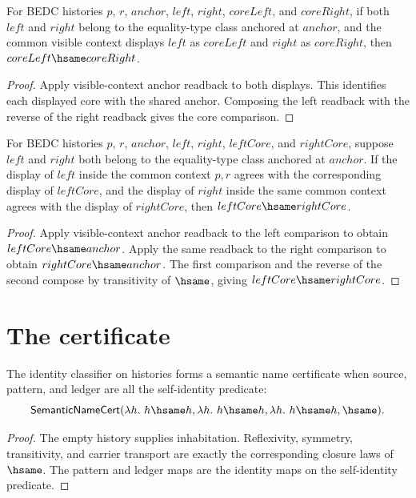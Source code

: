 \begin{theorem}
\label{thm:eqtype-class-carrier-visible-context-cores-deterministic}
For BEDC histories $p$, $r$, $anchor$, $left$, $right$, $coreLeft$, and
$coreRight$, if both $left$ and $right$ belong to the equality-type class
anchored at $anchor$, and the common visible context displays $left$ as
$coreLeft$ and $right$ as $coreRight$, then $coreLeft\hsame coreRight$.
\end{theorem}
\begin{proof}
Apply visible-context anchor readback to both displays. This identifies each
displayed core with the shared anchor. Composing the left readback with the
reverse of the right readback gives the core comparison.
\end{proof}

\begin{theorem}
\label{thm:eqtype-class-carrier-visible-context-pair-deterministic}
For BEDC histories $p$, $r$, $anchor$, $left$, $right$, $leftCore$, and
$rightCore$, suppose $left$ and $right$ both belong to the equality-type class
anchored at $anchor$. If the display of $left$ inside the common context $p,r$
agrees with the corresponding display of $leftCore$, and the display of
$right$ inside the same common context agrees with the display of $rightCore$,
then $leftCore\hsame rightCore$.
\end{theorem}
\begin{proof}
Apply visible-context anchor readback to the left comparison to obtain
$leftCore\hsame anchor$. Apply the same readback to the right comparison to
obtain $rightCore\hsame anchor$. The first comparison and the reverse of the
second compose by transitivity of $\hsame$, giving
$leftCore\hsame rightCore$.
\end{proof}

\section{The certificate}
\label{sec:eqtype-certificate}

\begin{theorem}
\label{thm:eqtype-identity-semantic-namecert}
The identity classifier on histories forms a semantic name certificate when
source, pattern, and ledger are all the self-identity predicate:
$$
\mathsf{SemanticNameCert}
(\lambda h.\ h\hsame h,\lambda h.\ h\hsame h,\lambda h.\ h\hsame h,\hsame).
$$
\end{theorem}
\begin{proof}
The empty history supplies inhabitation. Reflexivity, symmetry, transitivity,
and carrier transport are exactly the corresponding closure laws of $\hsame$.
The pattern and ledger maps are the identity maps on the self-identity
predicate.
\end{proof}

